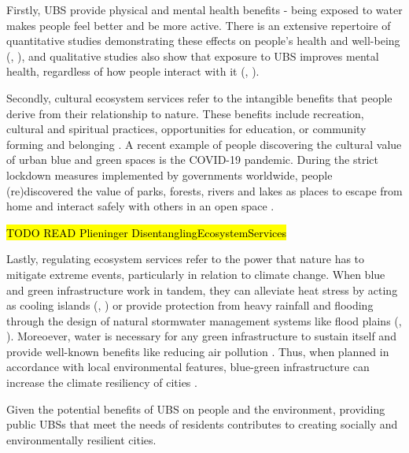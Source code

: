 \documentclass{article}
\begin{document}
Firstly, UBS provide physical and mental health benefits - being exposed to water makes people feel better and be more active. There is an extensive repertoire of quantitative studies demonstrating these effects on people's health and well-being (\cite{gascon2017outdoor}, \cite{britton2020blue}), and qualitative studies also show that exposure to UBS improves mental health, regardless of how people interact with it (\cite{garrett2019urban}, \cite{van2021urban}).

Secondly, cultural ecosystem services refer to the intangible benefits that people derive from their relationship to nature. These benefits include recreation, cultural and spiritual practices, opportunities for education, or community forming and belonging \parencite{phillips2021use}. A recent example of people discovering the cultural value of urban blue and green spaces is the COVID-19 pandemic. During the strict lockdown measures implemented by governments worldwide, people (re)discovered the value of parks, forests, rivers and lakes as places to escape from home and interact safely with others in an open space \parencite{kohsaka2021urban}. 

\hl{TODO READ Plieninger DisentanglingEcosystemServices}

Lastly, regulating ecosystem services refer to the power that nature has to mitigate extreme events, particularly in relation to climate change. When blue and green infrastructure work in tandem, they can alleviate heat stress by acting as cooling islands (\cite{gunawardena2017utilising}, \cite{lin2020water}) or provide protection from heavy rainfall and flooding through the design of natural stormwater management systems like flood plains (\cite{o2020sustainable}, \cite{ghofrani2017comprehensive}). Moreoever, water is necessary for  any green infrastructure to sustain itself and provide well-known benefits like reducing air pollution \parencite{pugh2012effectiveness}. Thus, when planned in accordance with local environmental features, blue-green infrastructure can increase the climate resiliency of cities \parencite{o2021international}.


Given the potential benefits of UBS on people and the environment, providing public UBSs that meet the needs of residents contributes to creating socially and environmentally resilient cities.
 
\end{document}
